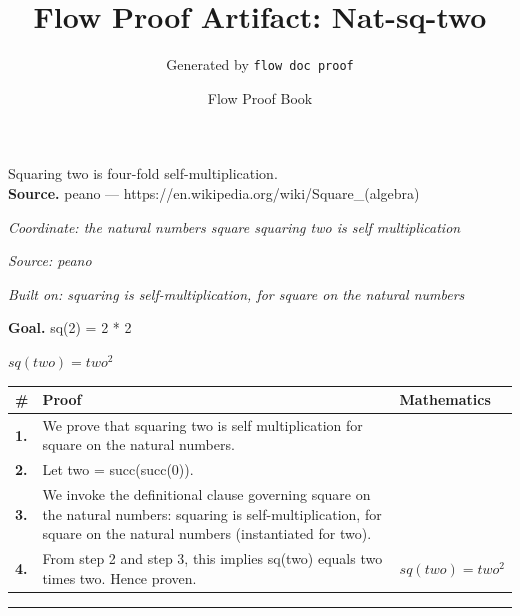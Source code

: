 \documentclass[11pt]{article}
\title{Flow Proof Artifact: Nat-sq-two}
\author{Generated by \texttt{flow doc proof}}
\date{Flow Proof Book}
\theoremstyle{definition}
\begin{document}
\maketitle
Squaring two is four-fold self-multiplication.\\[0.5em]
\textbf{Source.} peano — https://en.wikipedia.org/wiki/Square\_(algebra)\\[0.5em]
\bigskip
{}\par
\smallskip\noindent\textit{Coordinate: the natural numbers \cdot square \cdot squaring two is self multiplication}\par
\smallskip\noindent\textit{Source: peano}\par
\smallskip\noindent\textit{Built on: squaring is self-multiplication, for square on the natural numbers}\par
\medskip
\noindent\textbf{Goal.} sq(2) = 2 * 2\par
\noindent$\displaystyle sq(two) = two^{2}$\par
\medskip
\noindent
\begin{tabular}{@{} >{\raggedright\arraybackslash}p{} >{\raggedright\arraybackslash}p{} >{\raggedleft\arraybackslash}p{} @{}}
\textbf{\#} & \textbf{Proof} & \textbf{Mathematics} \\
\midrule
\textbf{1.} & We prove that squaring two is self multiplication for square on the natural numbers. & \\[0.45em]
\textbf{2.} & Let two = succ(succ(0)). & \\[0.45em]
\textbf{3.} & We invoke the definitional clause governing square on the natural numbers: squaring is self-multiplication, for square on the natural numbers (instantiated for two). & \\[0.45em]
\textbf{4.} & From step 2 and step 3, this implies sq(two) equals two times two. Hence proven. & $\displaystyle sq(two) = two^{2}$ \\[0.45em]
\bottomrule
\end{tabular}
\label{thm:Nat-square-squaring_two_is_self_multiplication}
\par\medskip\hrule
\end{document}
